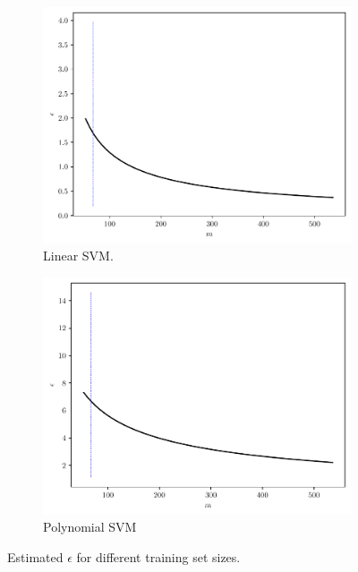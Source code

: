 \documentclass[conference]{IEEEtran}
\theoremstyle{definition}
\theoremstyle{remark}
\theoremstyle{remark}
\begin{document}
\begin{figure}
  \centering
  \begin{subfigure}[b]{0.45\textwidth}
    \centering \includegraphics[width=\textwidth]{figs/svm-linear-error.pdf}
    \caption{Linear SVM.}
  \end{subfigure}
  \begin{subfigure}[b]{0.45\textwidth}
    \centering \includegraphics[width=\textwidth]{figs/svm-poly-error.pdf}
    \caption{Polynomial SVM}
  \end{subfigure}
  \caption{Estimated $\epsilon$ for different training set sizes.}
  \label{fig:error-SVM}
\end{figure}
\end{document}

